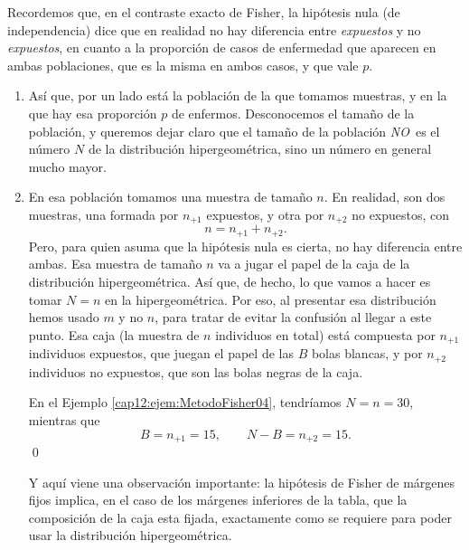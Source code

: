 Recordemos que, en el contraste exacto de Fisher, la hipótesis nula (de independencia) dice que en realidad no hay diferencia entre {\em expuestos} y no {\em expuestos}, en cuanto a la proporción de casos de enfermedad que aparecen en ambas poblaciones, que es la misma en ambos casos, y que vale $p$.
\begin{enumerate}
  \item Así que, por un lado está la población de la que tomamos muestras, y en la que hay esa proporción $p$ de enfermos. Desconocemos el tamaño de la población, y queremos dejar claro que el tamaño de la población {\em NO}\, es el número $N$ de la distribución hipergeométrica, sino un número en general mucho mayor.
  \item En esa población tomamos una muestra de tamaño $n$. En realidad, son dos muestras, una formada por $n_{+1}$ expuestos, y otra por $n_{+2}$ no expuestos, con
      \[n=n_{+1}+n_{+2}.\]
      Pero, para quien asuma que la hipótesis nula es cierta, no hay diferencia entre ambas. Esa muestra de tamaño $n$ va a jugar el papel de la caja de la distribución hipergeométrica. Así que, de hecho, lo que vamos a hacer es tomar $N=n$ en la hipergeométrica. Por eso, al presentar esa distribución hemos usado $m$ y no $n$, para tratar de evitar la confusión al llegar a este punto. Esa caja (la muestra de $n$ individuos en total) está compuesta por $n_{+1}$ individuos expuestos, que juegan el papel de las $B$ bolas blancas, y por $n_{+2}$ individuos no expuestos, que son las bolas negras de la caja.
      \begin{ejemplo}
      \label{cap12:ejem:MetodoFisher05}
      En el Ejemplo \ref{cap12:ejem:MetodoFisher04}, tendríamos $N=n=30$, mientras que
      \[B=n_{+1}=15,\qquad N-B=n_{+2}=15.\]
      \qed
      \end{ejemplo}
      Y aquí viene una observación importante: la hipótesis de Fisher de márgenes fijos implica, en el caso de los márgenes inferiores de la tabla, que la composición de la caja esta fijada, exactamente como se requiere para poder usar la distribución hipergeométrica.


\end{enumerate}
